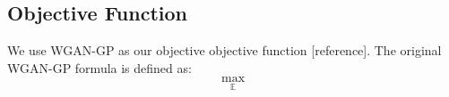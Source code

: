 \subsection{Objective Function}
We use WGAN-GP as our objective objective function [reference]. The original WGAN-GP formula is defined as:
\begin{equation}
\underset{\mathbb{E}}{\max}
\end{equation}